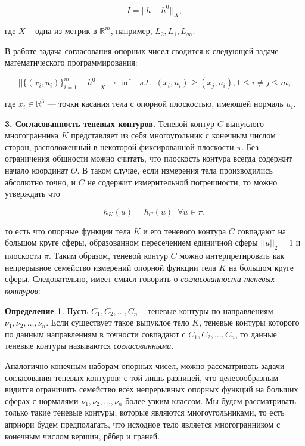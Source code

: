 \documentclass[a4paper, 10pt]{article}
\theoremstyle{definition}
\newtheorem{SmartDefinition}{Определение}
\theoremstyle{plain}
\theoremstyle{plain}
\begin{document}
\begin{equation*}
 I = || h - h^{0} ||_{X},
\end{equation*}

где $X$ -- одна из метрик  в $\mathbb{R}^{m}$, например,
$L_{2}, L_{1}, L_{\infty}$.

В работе \cite{GardnerKiderlen} задача согласования опорных чисел сводится к
следующей задаче математического программирования:

\begin{equation}
\label{equation:gardner-kiderlen}
 ||\{(x_{i}, u_{i})\}_{i = 1}^{m} - h^{0}||_{X} \to \inf \;\;\; s. t. \;\;
 (x_{i}, u_{i}) \geq (x_{j}, u_{i}), 1 \leq i \neq j \leq m,
\end{equation}

где $x_{i} \in \mathbb{R}^{3}$ --- точки касания тела с опорной плоскостью,
имеющей нормаль $u_{i}$.


\textbf{3. Согласованность теневых контуров.}
Теневой контур $C$ выпуклого многогранника $K$ представляет из себя
многоугольник с конечным числом сторон, расположенный в некоторой фиксированной
плоскости $\pi$. Без ограничения общности можно считать, что плоскость контура
всегда содержит начало координат $O$. В таком случае, если измерения тела
производились абсолютно точно, и $C$ не содержит измерительной погрешности, то
можно утверждать что

\begin{equation*}
 h_{K}(u) = h_{C}(u) \;\; \forall u \in \pi,
\end{equation*}

то есть что опорные функции тела $K$ и его теневого контура $C$ совпадают на
большом круге сферы, образованном пересечением единичной сферы $||u||_{2} = 1$
и плоскости $\pi$. Таким образом, теневой контур $C$ можно интерпретировать как
непрерывное семейство измерений опорной функции тела $K$ на большом круге сферы.
Следовательно, имеет смысл говорить о \textit{согласованности теневых контуров}:

\begin{SmartDefinition}
 Пусть $C_{1}, C_{2}, \ldots, C_{n}$ -- теневые контуры по направлениям
 $\nu_{1}, \nu_{2}, \ldots, \nu_{n}$. Если существует такое выпуклое тело $K$,
 теневые контуры которого по данным направлениям в точности совпадают с
 $C_{1}, C_{2}, \ldots, C_{n}$, то данные теневые контуры называются
 \textit{согласованными}.
\end{SmartDefinition}

Аналогично конечным наборам опорных чисел, можно рассматривать задачи
согласования теневых контуров: с той лишь разницей, что целесообразным видится
ограничить семейство всех непрерывных опорных функций на больших сферах с
нормалями $\nu_{1}, \nu_{2}, \ldots, \nu_{n}$ более узким классом. Мы будем
рассматривать только такие теневые контуры, которые являются многоугольниками,
то есть априори будем предполагать, что исходное тело является многогранником
с конечным числом вершин, рёбер и граней.
\end{document}
